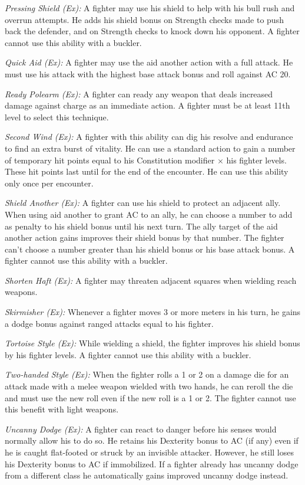 \textit{Pressing Shield (Ex):} A fighter may use his shield to help with his bull rush and overrun attempts. He adds his shield bonus on Strength checks made to push back the defender, and on Strength checks to knock down his opponent. A fighter cannot use this ability with a buckler.

\textit{Quick Aid (Ex):} A fighter may use the aid another action with a full attack. He must use his attack with the highest base attack bonus and roll against AC 20.

\textit{Ready Polearm (Ex):} A fighter can ready any weapon that deals increased damage against charge as an immediate action. A fighter must be at least 11th level to select this technique.

\textit{Second Wind (Ex):} A fighter with this ability can dig his resolve and endurance to find an extra burst of vitality. He can use a standard action to gain a number of temporary hit points equal to his Constitution modifier $\times$ his fighter levels. These hit points last until for the end of the encounter. He can use this ability only once per encounter.

\textit{Shield Another (Ex):} A fighter can use his shield to protect an adjacent ally. When using aid another to grant AC to an ally, he can choose a number to add as penalty to his shield bonus until his next turn. The ally target of the aid another action gains improves their shield bonus by that number. The fighter can't choose a number greater than his shield bonus or his base attack bonus. A fighter cannot use this ability with a buckler.

\textit{Shorten Haft (Ex):} A fighter may threaten adjacent squares when wielding reach weapons.

\textit{Skirmisher (Ex):} Whenever a fighter moves 3 or more meters in his turn, he gains a dodge bonus against ranged attacks equal to \onequarter his fighter.

\textit{Tortoise Style (Ex):} While wielding a shield, the fighter improves his shield bonus by \onequarter his fighter levels. A fighter cannot use this ability with a buckler.

\textit{Two-handed Style (Ex):} When the fighter rolls a 1 or 2 on a damage die for an attack made with a melee weapon wielded with two hands, he can reroll the die and must use the new roll even if the new roll is a 1 or 2. The fighter cannot use this benefit with light weapons.

\textit{Uncanny Dodge (Ex):} A fighter can react to danger before his senses would normally allow his to do so. He retains his Dexterity bonus to AC (if any) even if he is caught flat-footed or struck by an invisible attacker. However, he still loses his Dexterity bonus to AC if immobilized. If a fighter already has uncanny dodge from a different class he automatically gains improved uncanny dodge instead.

